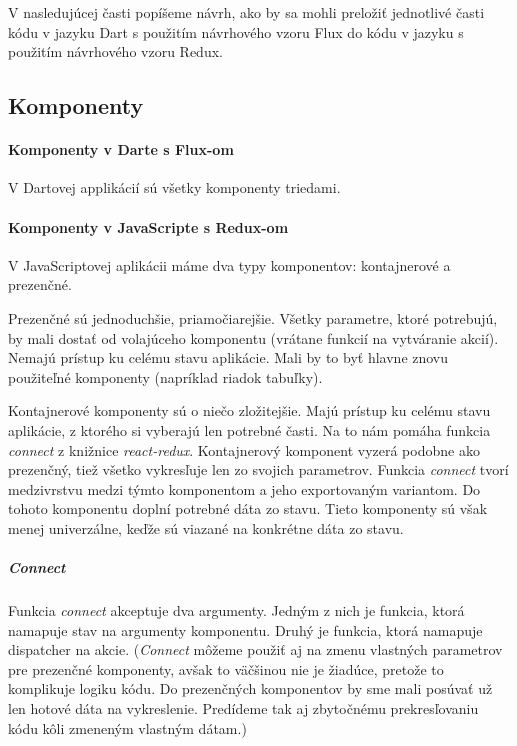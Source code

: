 \NEW{}
V nasledujúcej časti popíšeme návrh, ako by sa mohli preložiť jednotlivé časti kódu v jazyku Dart s použitím návrhového vzoru Flux do kódu v jazyku \JS{} s použitím návrhového vzoru Redux.

\subsection{Komponenty}

\paragraph{Komponenty v Darte s Flux-om}
V Dartovej applikácií sú všetky komponenty triedami.

\paragraph{Komponenty v JavaScripte s Redux-om}
V JavaScriptovej aplikácii máme dva typy komponentov: kontajnerové a prezenčné. 

Prezenčné sú jednoduchšie, priamočiarejšie. Všetky parametre, ktoré potrebujú, by mali dostať od volajúceho komponentu (vrátane funkcií na vytváranie akcií). Nemajú prístup ku celému stavu aplikácie. Mali by to byť hlavne znovu použiteľné komponenty (napríklad riadok tabuľky).

Kontajnerové komponenty sú o niečo zložitejšie. Majú prístup ku celému stavu aplikácie, z ktorého si vyberajú len potrebné časti. Na to nám pomáha funkcia \emph{connect} z knižnice \emph{react-redux}. Kontajnerový komponent vyzerá podobne ako prezenčný, tiež všetko vykresľuje len zo svojich parametrov. 
Funkcia \emph{connect} tvorí medzivrstvu medzi týmto komponentom a jeho exportovaným variantom. Do tohoto komponentu doplní potrebné dáta zo stavu. Tieto komponenty sú však menej univerzálne, keďže sú viazané na konkrétne dáta zo stavu.

\subparagraph{Connect}
\label{func:connect}
Funkcia \emph{connect} akceptuje dva argumenty. Jedným z nich je funkcia, ktorá namapuje stav na argumenty komponentu. Druhý je funkcia, ktorá namapuje dispatcher na akcie. %
(\emph{Connect} môžeme použiť aj na zmenu vlastných parametrov pre prezenčné komponenty, avšak to väčšinou nie je žiadúce, pretože to komplikuje logiku kódu. Do prezenčných komponentov by sme mali posúvať už len hotové dáta na vykreslenie. Predídeme tak aj zbytočnému prekresľovaniu kódu kôli zmeneným vlastným dátam.)

